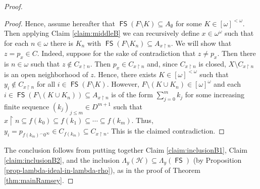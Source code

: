 \documentclass{amsart}
\theoremstyle{plain}
\theoremstyle{definition}
\theoremstyle{remark}
\DeclareMathOperator{\FS}{\mathsf{FS}}
\begin{document}
\begin{proof}
\begin{proof}
Hence, assume hereafter that $\FS(F\setminus K)\subseteq A_\emptyset$ for some $K\in[\omega]^{<\omega}$. Then applying Claim \ref{claim:middleB} we can recursively define $x\in\omega^\omega$ such that for each $n\in\omega$ there is $K_n$ with $\FS(F\setminus K_n)\subseteq A_{x\restriction n}$. We will show that $z=p_x\in C$. 
%
Indeed, suppose for the sake of contradiction that $z\neq p_x$. Then there is $n\in\omega$ such that $z\notin C_{x\restriction n}$. Then $p_x\in C_{x\restriction n}$ and, since $C_{x\restriction n}$ is closed, $X\setminus C_{x\restriction n}$ is an open neighborhood of $z$. Hence, there exists $K\in[\omega]^{<\omega}$ such that $y_{i}\notin C_{x\restriction n}$ for all $i\in\FS(F\setminus K)$. However, $F\setminus (K\cup K_n)\in[\omega]^\omega$ and each $i\in \FS(F\setminus (K\cup K_n))\subseteq A_{x\restriction n}$ is of the form $\sum_{j=0}^m k_j$ for some increasing finite sequence $(k_j)_{j\leq m}\in D^{m+1}$ such that $x\restriction n\subseteq f(k_0)\subseteq f(k_1)\subseteq\cdots\subseteq f(k_m)$. Thus, $y_i=p_{f(k_m)^\frown 0^\infty}\in C_{f(k_m)}\subseteq C_{x\restriction n}$. This is the claimed contradiction. 
\end{proof}

The conclusion follows from putting together Claim \ref{claim:inclusionB1}, Claim \ref{claim:inclusionB2}, and the inclusion  $\Lambda_y(\mathcal{H})\subseteq \Lambda_y(\FS)$ (by Proposition \ref{prop-lambda-ideal-in-lambda-rho}), as in the proof of Theorem \ref{thm:mainRamsey}. 
\end{proof}






\end{document}
